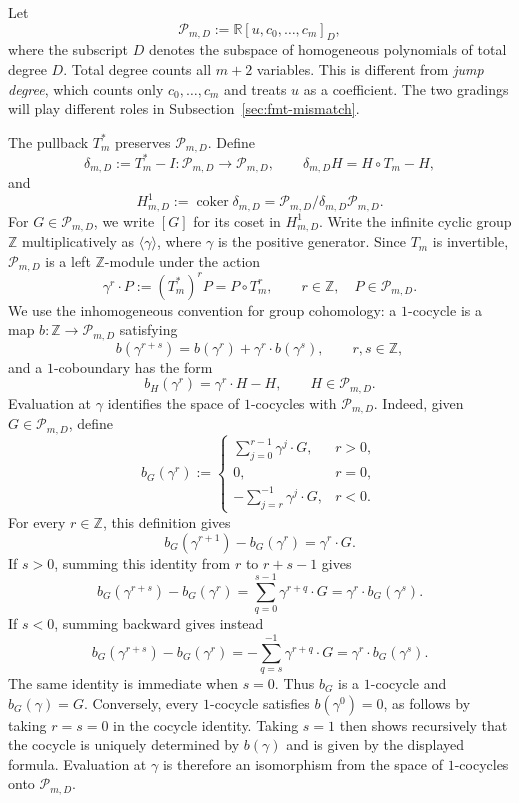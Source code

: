 \documentclass[11pt]{amsart}
\theoremstyle{plain}
\theoremstyle{definition}
\theoremstyle{remark}
\numberwithin{equation}{section}
\theoremstyle{plain}
\begin{document}
Let
\begin{equation}\label{eq:homogeneous-profile-space}
	\mathscr P_{m,D}
	:=\mathbb R[u,c_0,\ldots,c_m]_D,
\end{equation}
where the subscript $D$ denotes the subspace of homogeneous polynomials of
total degree $D$.
Total degree counts all $m+2$ variables.  This is different from
\emph{jump degree}, which counts only $c_0,\ldots,c_m$ and treats $u$ as a
coefficient.  The two gradings will play different roles in
Subsection~\ref{sec:fmt-mismatch}.

The pullback $T_m^*$ preserves $\mathscr P_{m,D}$.  Define
\begin{equation}\label{eq:profile-coboundary-map}
	\delta_{m,D}
	:=T_m^*-I:
	\mathscr P_{m,D}\longrightarrow\mathscr P_{m,D},
	\qquad
	\delta_{m,D}H=H\circ T_m-H,
\end{equation}
and
\begin{equation}\label{eq:profile-cohomology}
	H^1_{m,D}
	:=\operatorname{coker}\delta_{m,D}
	=\mathscr P_{m,D}/\delta_{m,D}\mathscr P_{m,D}.
\end{equation}
For $G\in\mathscr P_{m,D}$, we write $[G]$ for its coset in $H^1_{m,D}$. 
Write the infinite cyclic group $\mathbb Z$ multiplicatively as
$\langle\gamma\rangle$, where $\gamma$ is the positive generator.  Since
$T_m$ is invertible, $\mathscr P_{m,D}$ is a left $\mathbb Z$-module under the action
\[
	\gamma^r\cdot P:=(T_m^*)^rP=P\circ T_m^r,
	\qquad r\in\mathbb Z,\quad P\in\mathscr P_{m,D}.
\]
We use the inhomogeneous convention for group cohomology: a $1$-cocycle is a
map $b:\mathbb Z\to\mathscr P_{m,D}$ satisfying
\[
	b(\gamma^{r+s})
	=b(\gamma^r)+\gamma^r\cdot b(\gamma^s),
	\qquad r,s\in\mathbb Z,
\]
and a $1$-coboundary has the form
\[
	b_H(\gamma^r)=\gamma^r\cdot H-H,
	\qquad H\in\mathscr P_{m,D}.
\]
Evaluation at $\gamma$ identifies the space of $1$-cocycles with
$\mathscr P_{m,D}$.  Indeed, given $G\in\mathscr P_{m,D}$, define
\[
	b_G(\gamma^r):=
	\begin{cases}
		\displaystyle\sum_{j=0}^{r-1}\gamma^j\cdot G,
			& r>0,\\[6pt]
		0,& r=0,\\[4pt]
		\displaystyle-\sum_{j=r}^{-1}\gamma^j\cdot G,
			& r<0.
	\end{cases}
\]
For every $r\in\mathbb Z$, this definition gives
\[
	b_G(\gamma^{r+1})-b_G(\gamma^r)=\gamma^r\cdot G.
\]
If $s>0$, summing this identity from $r$ to $r+s-1$ gives
\[
	b_G(\gamma^{r+s})-b_G(\gamma^r)
	=\sum_{q=0}^{s-1}\gamma^{r+q}\cdot G
	=\gamma^r\cdot b_G(\gamma^s).
\]
If $s<0$, summing backward gives instead
\[
	b_G(\gamma^{r+s})-b_G(\gamma^r)
	=-\sum_{q=s}^{-1}\gamma^{r+q}\cdot G
	=\gamma^r\cdot b_G(\gamma^s).
\]
The same identity is immediate when $s=0$.
Thus $b_G$ is a $1$-cocycle and $b_G(\gamma)=G$.  Conversely, every
$1$-cocycle satisfies $b(\gamma^0)=0$, as follows by taking $r=s=0$ in
the cocycle identity.  Taking $s=1$ then shows
recursively that the cocycle is uniquely determined by $b(\gamma)$ and is
given by the displayed formula.  Evaluation at $\gamma$
is therefore an isomorphism from the space of $1$-cocycles onto
$\mathscr P_{m,D}$.
\end{document}
